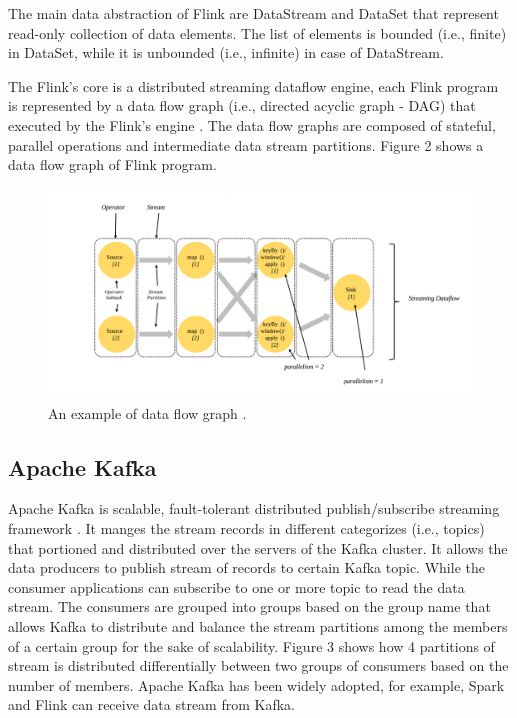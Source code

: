 \documentclass[]{article}
\begin{document}
\par The main data abstraction of Flink are DataStream and DataSet that represent read-only collection of data elements. The list of elements is bounded (i.e., finite) in DataSet, while it is unbounded (i.e., infinite) in case of DataStream.

\par The Flink's core is a distributed streaming dataflow engine,  each Flink program is represented by a data flow graph (i.e., directed acyclic graph - DAG) that executed by the Flink's engine \cite{flink_paper}. The data flow graphs are composed of stateful, parallel operations and intermediate data stream partitions. Figure 2 shows a data flow graph of Flink program.


\begin{figure}[h]
 
  \centering
    \includegraphics[width=\textwidth, height=.4\textheight]{flink_engine.png}
     \caption{ An example of data flow graph \cite{flink}.}
\end{figure} 
\subsection{Apache Kafka}
\par Apache Kafka is scalable, fault-tolerant distributed publish/subscribe streaming framework \cite{kafka}.
It manges the stream records in different categorizes (i.e., topics) that portioned and distributed over the servers of the Kafka cluster. It allows the data producers to publish stream of records to certain Kafka topic. While the consumer applications can subscribe to one or more topic to read the data stream. The consumers are grouped into groups based on the group name that allows Kafka to distribute and balance the stream partitions among the  members of a certain group for the sake of scalability. Figure 3 shows how 4 partitions of stream is distributed differentially between two groups of consumers based on the number of members. 
Apache Kafka has been widely  adopted, for example, 
Spark and Flink can receive data stream from Kafka. 
\end{document}
